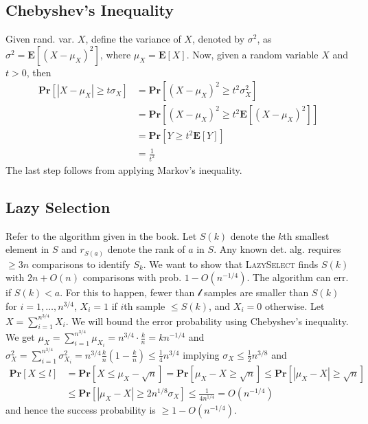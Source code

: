 \documentclass[12pt]{article}
\begin{document}
\subsection*{Chebyshev's Inequality}
Given rand. var. $X$, define the variance of $X$, denoted by $\sigma^2$, as $\sigma^2 = \mathbf{E}\left[ \left( X - \mu_X \right)^2 \right]$, where $\mu_X = \mathbf{E} \left[ X \right]$. Now, given a random variable $X$ and $t > 0$, then
\begin{align*}
\mathbf{Pr}\left[ \left| X-\mu_X \right| \geq t\sigma_X \right] &= \mathbf{Pr}\left[ \left( X-\mu_X \right)^2 \geq t^2\sigma_X^2 \right] \\
&= \mathbf{Pr}\left[ \left( X-\mu_X \right)^2 \geq t^2 \mathbf{E}\left[\left( X-\mu_X \right)^2\right] \right] \\
&= \mathbf{Pr}\left[ Y \geq t^2\mathbf{E}\left[Y\right] \right] \\
&= \frac{1}{t^2}
\end{align*}
The last step follows from applying Markov's inequality.

\subsection*{Lazy Selection}
Refer to the algorithm given in the book. Let $S(k)$ denote the $k$th smallest element in $S$ and $r_{S(a)}$ denote the rank of $a$ in $S$. Any known det. alg. requires $\geq 3n$ comparisons to identify $S_{k}$. We want to show that \textsc{LazySelect} finds $S(k)$ with $2n + O(n)$ comparisons with prob. $1-O(n^{-1/4})$. The algorithm can err. if $S(k) < a$. For this to happen, fewer than $\mathcal{l}$ samples are smaller than $S(k)$ for $i=1, \hdots, n^{3/4}$, $X_i=1$ if $i$th sample $\leq S(k)$, and $X_i = 0$ otherwise. Let $X=\sum^{n^{3/4}}_{i=1} X_i$. We will bound the error probability using Chebyshev's inequality. We get $\mu_X = \sum^{n^{3/4}}_{i=1} \mu_{X_i} = n^{3/4}\cdot \frac{k}{n}=kn^{-1/4}$ and $\sigma_X^2 = \sum^{n^{3/4}}_{i=1} \sigma^2_{X_i} = n^{3/4}\frac{k}{n}\left( 1-\frac{k}{n} \right) \leq \frac{1}{4}n^{3/4}$ implying $\sigma_X \leq \frac{1}{2}n^{3/8}$ and
\begin{align*}
\mathbf{Pr} \left[ X \leq l \right] &= \mathbf{Pr} \left[ X \leq \mu_X - \sqrt{n} \right] = \mathbf{Pr} \left[ \mu_X - X \geq \sqrt{n} \right] \leq \mathbf{Pr} \left[ \left| \mu_X - X \right| \geq \sqrt{n} \right] \\
&\leq \mathbf{Pr} \left[ \left| \mu_X - X \right| \geq 2n^{1/8}\sigma_X \right] \leq \frac{1}{4n^{1/4}} = O(n^{-1/4})
\end{align*}
and hence the success probability is $\geq 1-O(n^{-1/4})$.
\end{document}
